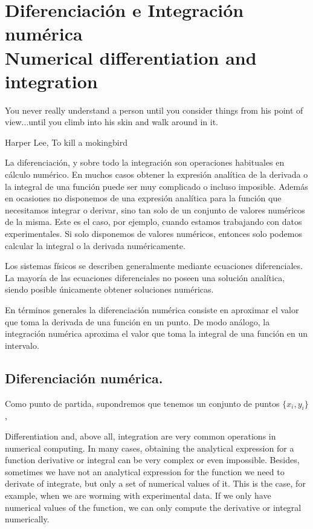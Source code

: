 \chapter{Diferenciación e Integración numérica\\ Numerical differentiation and integration}
\epigraph{You never really understand a person until you consider things from his point of view...until you climb into his skin and walk around in it.}{Harper Lee, To kill a mokingbird}


\begin{paracol}{2}
La diferenciación, y sobre todo la integración son operaciones habituales en cálculo nu\-mérico. En muchos casos obtener la expresión analítica de la derivada o la integral de una función puede ser muy complicado o incluso imposible. Además en ocasiones no disponemos de una expresión analítica para la función que necesitamos integrar o derivar, sino tan solo de un conjunto de valores numéricos de la misma. Este es el caso, por ejemplo, cuando estamos trabajando con datos experimentales. Si solo disponemos de valores numéricos, entonces solo podemos calcular la integral o la derivada numéricamente.

Los sistemas físicos se describen generalmente mediante ecuaciones diferenciales.  La mayoría de las ecuaciones diferenciales no poseen una solución analítica, siendo posible únicamente obtener soluciones numéricas. 

En términos generales la diferenciación nu\-mérica consiste en aproximar el valor que toma la derivada de una función en un punto. De modo análogo, la integración numérica aproxima el valor que toma la integral de una función en un intervalo.

\section{Diferenciación numérica.}
Como punto de partida, supondremos que tenemos un conjunto de puntos $\{x_i,y_i\}$,

\switchcolumn


Differentiation and, above all, integration are very common operations in numerical computing. In many cases, obtaining the analytical expression for a function derivative or integral can be very complex or even impossible. Besides, sometimes we have not an analytical expression for the function we need to derivate of integrate, but only a set of numerical values of it. This is the case, for example, when we are worming with experimental data. If we only have numerical values of the function, we can only compute the derivative or integral numerically.


\end{paracol}
